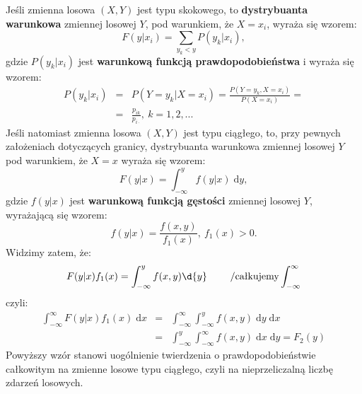 \documentclass[10pt,a4paper]{article}
\newcommand{\dd}{\; \mathrm{d}}
\begin{document}
Jeśli zmienna losowa $(X,Y)$ jest typu skokowego, to \textbf{dystrybuanta warunkowa} zmiennej losowej $Y$, pod warunkiem, że $X=x_i$, wyraża się wzorem:
\begin{equation}
F(y|x_i)=\sum_{y_k<y}P(y_k|x_i),
\end{equation}
gdzie $P(y_k|x_i)$ jest \textbf{warunkową funkcją prawdopodobieństwa} i wyraża się wzorem:
\begin{eqnarray}
P(y_k|x_i) & = & P(Y=y_k|X=x_i) = \frac{P(Y=y_k,X=x_i)}{P(X=x_i)} = \\\nonumber
& = & \frac{p_{ik}}{p_{i\cdot}},~k=1,2,...
\end{eqnarray}
Jeśli natomiast zmienna losowa $(X,Y)$ jest typu ciągłego, to, przy pewnych założeniach dotyczących granicy, dystrybuanta warunkowa zmiennej losowej $Y$ pod warunkiem,
że $X=x$ wyraża się wzorem:
\begin{equation}
F(y|x)=\int_{-\infty}^yf(y|x)\dd{y},
\end{equation}
gdzie $f(y|x)$ jest \textbf{warunkową funkcją gęstości} zmiennej losowej $Y$, wyrażającą się wzorem:
\begin{equation}
f(y|x) = \frac{f(x,y)}{f_1(x)},~f_1(x) > 0.
\end{equation}
Widzimy zatem, że:
\[F(y|x)f_1(x) = \int_{-\infty}^yf(x,y)\d{y}~~~~~~~/\textrm{całkujemy}\int_{-\infty}^{\infty}\]
czyli:
\begin{eqnarray}
\nonumber \int_{-\infty}^{\infty}F(y|x)f_1(x)\dd{x} & = & \int_{-\infty}^{\infty}\int_{-\infty}^yf(x,y)\dd{y}\dd{x}\\
\nonumber & = & \int_{-\infty}^y\int_{-\infty}^{\infty}f(x,y)\dd{x}\dd{y} = F_2(y)
\end{eqnarray}
Powyższy wzór stanowi uogólnienie twierdzenia o prawdopodobieństwie całkowitym na zmienne losowe typu ciągłego, czyli na nieprzeliczalną liczbę zdarzeń losowych.
\end{document}
